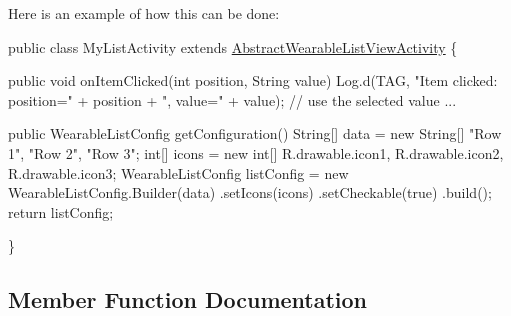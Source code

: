 Here is an example of how this can be done\+: 
\begin{DoxyPre}
    public class MyListActivity extends \hyperlink{classcom_1_1google_1_1devrel_1_1wcl_1_1widgets_1_1list_1_1AbstractWearableListViewActivity}{AbstractWearableListViewActivity} \{
\begin{DoxyVerb}public void onItemClicked(int position, String value) {
    Log.d(TAG, "Item clicked: position=" + position + ", value=" + value);
    // use the selected value ...
}

public WearableListConfig getConfiguration() {
    String[] data = new String[] {"Row 1", "Row 2", "Row 3"};
    int[] icons = new int[] { R.drawable.icon1, R.drawable.icon2, R.drawable.icon3};
    WearableListConfig listConfig = new WearableListConfig.Builder(data)
        .setIcons(icons)
        .setCheckable(true)
        .build();
    return listConfig;
}
\end{DoxyVerb}

    \}
 \end{DoxyPre}
 

\subsection{Member Function Documentation}

